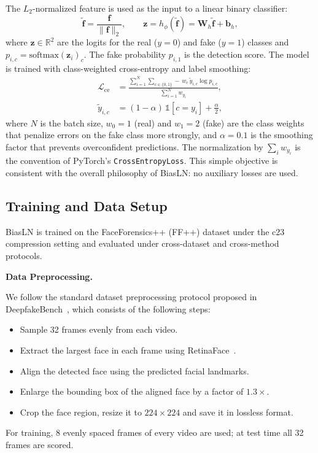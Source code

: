 \documentclass[fonts]{icst}
\begin{document}
The $L_2$-normalized feature is used as the input to a linear binary classifier:
\begin{equation}
\tilde{\mathbf{f}} = \frac{\mathbf{f}}{\lVert \mathbf{f} \rVert_2}, \qquad
\mathbf{z} = h_{\phi}(\tilde{\mathbf{f}}) = \mathbf{W}_h\tilde{\mathbf{f}}+\mathbf{b}_h,
\end{equation}
where $\mathbf{z} \in \mathbb{R}^2$ are the logits for the real ($y=0$) and fake ($y=1$) classes and $p_{i,c}=\mathrm{softmax}(\mathbf{z}_i)_c$. The fake probability $p_{i,1}$ is the detection score.
The model is trained with class-weighted cross-entropy and label smoothing:
\begin{equation}
\begin{aligned}
\mathcal{L}_{\mathrm{ce}}&=\frac{\sum_{i=1}^{N}\sum_{c\in\{0,1\}}-\,w_c\,\tilde{y}_{i,c}\log p_{i,c}}{\sum_{i=1}^{N}w_{y_i}},\\
\tilde{y}_{i,c}&=(1-\alpha)\,\mathbb{1}[c=y_i]+\tfrac{\alpha}{2},
\end{aligned}
\label{eq:ce}
\end{equation}
where $N$ is the batch size, $w_0=1$ (real) and $w_1=2$ (fake) are the class weights that penalize errors on the fake class more strongly, and $\alpha=0.1$ is the smoothing factor that prevents overconfident predictions. The normalization by $\sum_i w_{y_i}$ is the convention of PyTorch's \texttt{CrossEntropyLoss}.
This simple objective is consistent with the overall philosophy of BiasLN: no auxiliary losses are used.

\subsection{Training and Data Setup}
\label{sec:impl}

BiasLN is trained on the FaceForensics++ (FF++) dataset under the c23 compression setting and evaluated under cross-dataset and cross-method protocols.

\noindent\textbf{Data Preprocessing.}\par
We follow the standard dataset preprocessing protocol proposed in DeepfakeBench~\cite{yan2023deepfakebench}, which consists of the following steps:
\begin{itemize}[leftmargin=*, topsep=2pt, itemsep=2pt, label=--]
    \item Sample 32 frames evenly from each video.
    \item Extract the largest face in each frame using RetinaFace~\cite{deng2020retinaface}.
    \item Align the detected face using the predicted facial landmarks.
    \item Enlarge the bounding box of the aligned face by a factor of $1.3\times$.
    \item Crop the face region, resize it to $224 \times 224$ and save it in lossless format.
\end{itemize}
For training, 8 evenly spaced frames of every video are used; at test time all 32 frames are scored.
\end{document}
